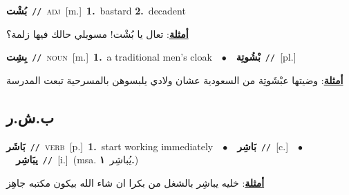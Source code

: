 \documentclass[10pt,a4paper,twoside]{article} %
\begin{document}
\begin{multicols}{2}
{\setlength\topsep{0pt}\textbf{\foreignlanguage{arabic}{بُشْت}}\ {\color{gray}\texttt{//}\color{black}}\ \textsc{adj}\ [m.]\ \textbf{1.}~bastard  \textbf{2.}~decadent\  \begin{flushright}\color{gray}\foreignlanguage{arabic}{\textbf{\underline{\foreignlanguage{arabic}{أمثلة}}}: تعال يا بُشْت! مسويلي حالك فيها زلمة؟}\end{flushright}\color{black}} \vspace{2mm}

{\setlength\topsep{0pt}\textbf{\foreignlanguage{arabic}{بِشِت}}\ {\color{gray}\texttt{//}\color{black}}\ \textsc{noun}\ [m.]\ \textbf{1.}~a traditional men’s cloak\ \ $\bullet$\ \ \setlength\topsep{0pt}\textbf{\foreignlanguage{arabic}{بْشُوتِة}}\ {\color{gray}\texttt{//}\color{black}}\ [pl.]\  \begin{flushright}\color{gray}\foreignlanguage{arabic}{\textbf{\underline{\foreignlanguage{arabic}{أمثلة}}}: وضيتها عبْشَوتِة من السعودية عشان ولادي يلبسوهن بالمسرحية تبعت المدرسة}\end{flushright}\color{black}} \vspace{2mm}

\vspace{-3mm}
\subsection*{\color{blue}\foreignlanguage{arabic}{ب.ش.ر}\color{blue}{}} 

{\setlength\topsep{0pt}\textbf{\foreignlanguage{arabic}{بَاشَر}}\ {\color{gray}\texttt{//}\color{black}}\ \textsc{verb}\ [p.]\ \textbf{1.}~start working immediately\ \ $\bullet$\ \ \setlength\topsep{0pt}\textbf{\foreignlanguage{arabic}{بَاشِر}}\ {\color{gray}\texttt{//}\color{black}}\ [c.]\ \ $\bullet$\ \ \setlength\topsep{0pt}\textbf{\foreignlanguage{arabic}{يبَاشِر}}\ {\color{gray}\texttt{//}\color{black}}\ [i.]\ \color{gray}(msa. \foreignlanguage{arabic}{يُباشِر}~\foreignlanguage{arabic}{\textbf{١.}})\color{black}\  \begin{flushright}\color{gray}\foreignlanguage{arabic}{\textbf{\underline{\foreignlanguage{arabic}{أمثلة}}}: خليه يباشِر بالشغل من بكرا ان شاء الله بيكون مكتبه جاهِز}\end{flushright}\color{black}} \vspace{2mm}


\end{multicols}
\end{document}
